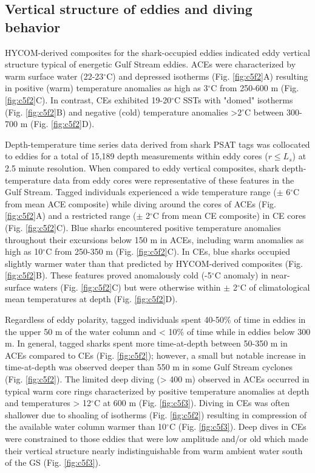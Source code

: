 \subsection{Vertical structure of eddies and diving behavior}

HYCOM-derived composites for the shark-occupied eddies indicated eddy vertical structure typical of energetic Gulf Stream eddies. ACEs were characterized by warm surface water (22-23$^\circ$C) and depressed isotherms (Fig. \ref{fig:c5f2}A) resulting in positive (warm) temperature anomalies as high as 3$^\circ$C from 250-600 m (Fig. \ref{fig:c5f2}C). In contrast, CEs exhibited 19-20$^\circ$C SSTs with "domed" isotherms (Fig. \ref{fig:c5f2}B) and negative (cold) temperature anomalies >2$^\circ$C between 300-700 m (Fig. \ref{fig:c5f2}D).

Depth-temperature time series data derived from shark PSAT tags was collocated to eddies for a total of 15,189 depth measurements within eddy cores ($r \leq L_s$) at 2.5 minute resolution. When compared to eddy vertical composites, shark depth-temperature data from eddy cores were representative of these features in the Gulf Stream. Tagged individuals experienced a wide temperature range ($\pm$ 6$^\circ$C from mean ACE composite) while diving around the cores of ACEs (Fig. \ref{fig:c5f2}A) and a restricted range ($\pm$ 2$^\circ$C from mean CE composite) in CE cores (Fig. \ref{fig:c5f2}C). Blue sharks encountered positive temperature anomalies throughout their excursions below 150 m in ACEs, including warm anomalies as high as 10$^\circ$C from 250-350 m (Fig. \ref{fig:c5f2}C). In CEs, blue sharks occupied slightly warmer water than that predicted by HYCOM-derived composites (Fig. \ref{fig:c5f2}B). These features proved anomalously cold (-5$^\circ$C anomaly) in near-surface waters (Fig. \ref{fig:c5f2}C) but were otherwise within $\pm$ 2$^\circ$C of climatological mean temperatures at depth (Fig. \ref{fig:c5f2}D). 

Regardless of eddy polarity, tagged individuals spent 40-50\% of time in eddies in the upper 50 m of the water column and < 10\% of time while in eddies below 300 m. In general, tagged sharks spent more time-at-depth between 50-350 m in ACEs compared to CEs (Fig. \ref{fig:c5f2}); however, a small but notable increase in time-at-depth was observed deeper than 550 m in some Gulf Stream cyclones (Fig. \ref{fig:c5f2}). The limited deep diving (> 400 m) observed in ACEs occurred in typical warm core rings characterized by positive temperature anomalies at depth and temperatures > 12$^\circ$C at 600 m (Fig. \ref{fig:c5f3}). Diving in CEs was often shallower due to shoaling of isotherms (Fig. \ref{fig:c5f2}) resulting in compression of the available water column warmer than 10$^\circ$C (Fig. \ref{fig:c5f3}). Deep dives in CEs were constrained to those eddies that were low amplitude and/or old which made their vertical structure nearly indistinguishable from warm ambient water south of the GS (Fig. \ref{fig:c5f3}).

